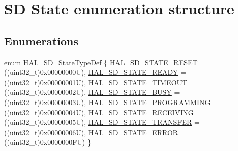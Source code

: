 \hypertarget{group___s_d___exported___types___group1}{}\section{SD State enumeration structure}
\label{group___s_d___exported___types___group1}
\subsection*{Enumerations}
\begin{DoxyCompactItemize}
\item 
enum \mbox{\hyperlink{group___s_d___exported___types___group1_ga0012126bcdfea270fe367bfaec2692ba}{H\+A\+L\+\_\+\+S\+D\+\_\+\+State\+Type\+Def}} \{ \newline
\mbox{\hyperlink{group___s_d___exported___types___group1_gga0012126bcdfea270fe367bfaec2692baaa6dd140391c3c9377280e2f262b24343}{H\+A\+L\+\_\+\+S\+D\+\_\+\+S\+T\+A\+T\+E\+\_\+\+R\+E\+S\+ET}} = ((uint32\+\_\+t)0x00000000U), 
\mbox{\hyperlink{group___s_d___exported___types___group1_gga0012126bcdfea270fe367bfaec2692baa57ef83018586c20a2635517889a8aa9d}{H\+A\+L\+\_\+\+S\+D\+\_\+\+S\+T\+A\+T\+E\+\_\+\+R\+E\+A\+DY}} = ((uint32\+\_\+t)0x00000001U), 
\mbox{\hyperlink{group___s_d___exported___types___group1_gga0012126bcdfea270fe367bfaec2692baa6f546f5dad19b8645baa3a2b6347e890}{H\+A\+L\+\_\+\+S\+D\+\_\+\+S\+T\+A\+T\+E\+\_\+\+T\+I\+M\+E\+O\+UT}} = ((uint32\+\_\+t)0x00000002U), 
\mbox{\hyperlink{group___s_d___exported___types___group1_gga0012126bcdfea270fe367bfaec2692baacb6995346a95fee71115415ba08a863e}{H\+A\+L\+\_\+\+S\+D\+\_\+\+S\+T\+A\+T\+E\+\_\+\+B\+U\+SY}} = ((uint32\+\_\+t)0x00000003U), 
\newline
\mbox{\hyperlink{group___s_d___exported___types___group1_gga0012126bcdfea270fe367bfaec2692baa2663656972833933ba62072461a98220}{H\+A\+L\+\_\+\+S\+D\+\_\+\+S\+T\+A\+T\+E\+\_\+\+P\+R\+O\+G\+R\+A\+M\+M\+I\+NG}} = ((uint32\+\_\+t)0x00000004U), 
\mbox{\hyperlink{group___s_d___exported___types___group1_gga0012126bcdfea270fe367bfaec2692baa24177216993afe4a4d3fc584bf2e5820}{H\+A\+L\+\_\+\+S\+D\+\_\+\+S\+T\+A\+T\+E\+\_\+\+R\+E\+C\+E\+I\+V\+I\+NG}} = ((uint32\+\_\+t)0x00000005U), 
\mbox{\hyperlink{group___s_d___exported___types___group1_gga0012126bcdfea270fe367bfaec2692baa713f5ed88dd34894ee5d97cd6a5b8f66}{H\+A\+L\+\_\+\+S\+D\+\_\+\+S\+T\+A\+T\+E\+\_\+\+T\+R\+A\+N\+S\+F\+ER}} = ((uint32\+\_\+t)0x00000006U), 
\mbox{\hyperlink{group___s_d___exported___types___group1_gga0012126bcdfea270fe367bfaec2692baa10a36835aa2cd7f1ddf7c72193899abd}{H\+A\+L\+\_\+\+S\+D\+\_\+\+S\+T\+A\+T\+E\+\_\+\+E\+R\+R\+OR}} = ((uint32\+\_\+t)0x0000000\+FU)
 \}
\end{DoxyCompactItemize}



